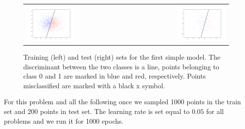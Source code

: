 \documentclass{article}
\begin{document}
  \begin{figure}[h]
 \begin{center}
\begin{tabular}{l r}
  \includegraphics[width=0.5\textwidth]{fig/fig_linear_simplemodel_03err_train} & 
  \includegraphics[width=0.5\textwidth]{fig/fig_linear_simplemodel_05err_test} \\
  \end{tabular}
   \caption{Training (left) and test (right) sets for the first simple model. 
   The discriminant between the two classes is a line, points belonging to class 0 and 1 are marked in blue and red, respectively. 
   Points misclassified are marked with a black x symbol.  \label{fig_lin_results}}
  \end{center}
  \end{figure}
  
For this problem and all the following once we sampled 1000 points in the train set and 200 points in test set. 
The learning rate is set equal to $0.05$ for all problems and we run it for 1000 epochs. 
\end{document}
